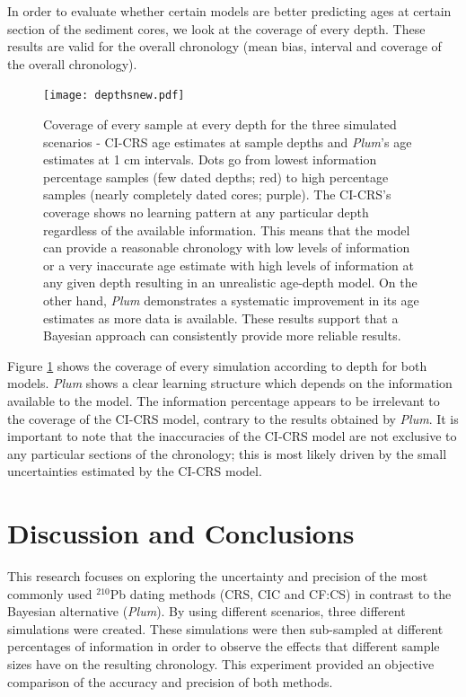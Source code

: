 \documentclass [10pt] {article}
\begin{document}
In order to evaluate whether certain models are better predicting ages at certain section of the sediment cores, we look at the coverage of every depth. 
These results are valid for the overall chronology (mean bias, interval and coverage of the overall chronology). 

\begin{figure}[!]
	\begin{centering}
		\texttt{[image: depthsnew.pdf]}
		\caption{Coverage of every sample at every depth for the three simulated scenarios - CI-CRS age estimates at sample depths and \textit{Plum}'s age estimates at 1 cm intervals. Dots go from lowest information percentage samples (few dated depths; red) to high percentage samples (nearly completely dated cores; purple). The CI-CRS's coverage shows no learning pattern at any particular depth regardless of the available information. This means that the model can provide a reasonable chronology with low levels of information or a very inaccurate age estimate with high levels of information at any given depth resulting in an unrealistic age-depth model. On the other hand, \textit{Plum} demonstrates a systematic improvement in its age estimates as more data is available. These results support that a Bayesian approach can consistently provide more reliable results.     }
		\label{fig:depths}
	\end{centering}
\end{figure}

Figure \ref{fig:depths} shows the coverage of every simulation according to depth for both models.
\textit{Plum} shows a clear learning structure which depends on the information available to the model.
The information percentage appears to be irrelevant to the coverage of the CI-CRS model, contrary to the results obtained by \textit{Plum}.
It is important to note that the inaccuracies of the CI-CRS model are not exclusive to any particular sections of the chronology; this is most likely driven by the small uncertainties estimated by the CI-CRS model.



\section{Discussion and Conclusions}

This research focuses on exploring the uncertainty and precision of the most commonly used $^{210}$Pb dating methods (CRS, CIC and CF:CS) in contrast to the Bayesian alternative (\textit{Plum}).
By using different scenarios, three different simulations were created.
These simulations were then sub-sampled at different percentages of information in order to observe the effects that different sample sizes have on the resulting chronology. 
This experiment provided an objective comparison of the accuracy and precision of both methods.
\end{document}
